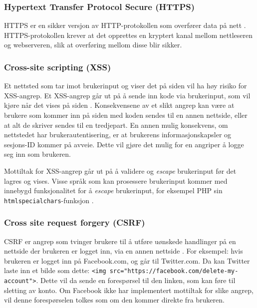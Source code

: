 \subsubsection{Hypertext Transfer Protocol Secure (HTTPS)}
\label{sec:analysis-security-https}
HTTPS er en sikker versjon av HTTP-protokollen som overfører data på nett \cite{rfc26161999hypertext}. HTTPS-protokollen krever at det opprettes en kryptert kanal mellom nettleseren og webserveren, slik at overføring mellom disse blir sikker.

\subsubsection{Cross-site scripting (XSS)}
\label{sec:analysis-security-xss}
Et nettsted som tar imot brukerinput og viser det på siden vil ha høy risiko for XSS-angrep.
Et XSS-angrep går ut på å sende inn kode via brukerinput, som vil kjøre når det vises på siden \cite[s.~179-183]{NattTomHeine2015Datasikkerhet}. Konsekvensene av et slikt angrep kan være at brukere som kommer inn på siden med koden sendes til en annen nettside, eller at alt de skriver sendes til en tredjepart. En annen mulig konsekvens, om nettstedet har brukerautentisering, er at brukerens informasjonskapsler og sesjons-ID kommer på avveie. Dette vil gjøre det mulig for en angriper å logge seg inn som brukeren.

Mottiltak for XSS-angrep går ut på å validere og \textit{escape} brukerinput før det lagres og vises.
Visse språk som kan prosessere brukerinput kommer med innebygd funksjonalitet for å \textit{escape} brukerinput, for eksempel PHP sin \lstinline{htmlspecialchars}-funksjon \cite{php_htmlspecialchars}.

\subsubsection{Cross site request forgery (CSRF)}
\label{sec:analysis-security-csrf}
CSRF er angrep som tvinger brukere til å utføre uønskede handlinger på en nettside der brukeren er logget inn, via en annen nettside \cite[s.~183-186]{NattTomHeine2015Datasikkerhet}. For eksempel: hvis brukeren er logget inn på Facebook.com, og går til Twitter.com. Da kan Twitter laste inn et bilde som dette: \lstinline{<img src="https://facebook.com/delete-my-account">}. Dette vil da sende en forespørsel til den linken, som kan føre til sletting av konto. Om Facebook ikke har implementert mottiltak for slike angrep, vil denne forespørselen tolkes som om den kommer direkte fra brukeren.

